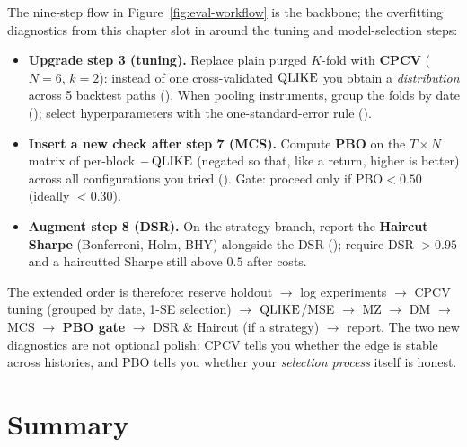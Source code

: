 \begin{keyidea}
The nine-step flow in Figure~\ref{fig:eval-workflow} is the backbone; the overfitting diagnostics from this chapter slot in around the tuning and model-selection steps:
\begin{itemize}[nosep]
  \item \textbf{Upgrade step 3 (tuning).} Replace plain purged $K$-fold with \textbf{CPCV} ($N=6$, $k=2$): instead of one cross-validated $\operatorname{QLIKE}$ you obtain a \emph{distribution} across 5 backtest paths (). When pooling instruments, group the folds by date (); select hyperparameters with the one-standard-error rule ().
  \item \textbf{Insert a new check after step 7 (MCS).} Compute \textbf{PBO} on the $T \times N$ matrix of per-block $-\operatorname{QLIKE}$ (negated so that, like a return, higher is better) across all configurations you tried (). Gate: proceed only if $\text{PBO} < 0.50$ (ideally $< 0.30$).
  \item \textbf{Augment step 8 (DSR).} On the strategy branch, report the \textbf{Haircut Sharpe} (Bonferroni, Holm, BHY) alongside the DSR (); require DSR $> 0.95$ and a haircutted Sharpe still above $0.5$ after costs.
\end{itemize}
The extended order is therefore: reserve holdout $\rightarrow$ log experiments $\rightarrow$ CPCV tuning (grouped by date, 1-SE selection) $\rightarrow$ $\operatorname{QLIKE}$/MSE $\rightarrow$ MZ $\rightarrow$ DM $\rightarrow$ MCS $\rightarrow$ \textbf{PBO gate} $\rightarrow$ DSR \& Haircut (if a strategy) $\rightarrow$ report. The two new diagnostics are not optional polish: CPCV tells you whether the edge is stable across histories, and PBO tells you whether your \emph{selection process} itself is honest.
\end{keyidea}


\section{Summary}
\label{sec:eval-summary}

